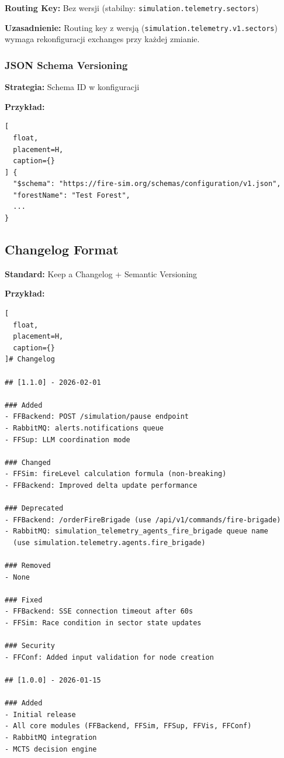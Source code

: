 \textbf{Routing Key:} Bez wersji (stabilny: \texttt{simulation.telemetry.sectors})

\textbf{Uzasadnienie:} Routing key z wersją (\texttt{simulation.telemetry.v1.sectors}) wymaga rekonfiguracji exchanges przy każdej zmianie.

\subsubsection{JSON Schema Versioning}

\textbf{Strategia:} Schema ID w konfiguracji

\textbf{Przykład:}
\begin{lstlisting}[
  float,
  placement=H,
  caption={}
] {
  "$schema": "https://fire-sim.org/schemas/configuration/v1.json",
  "forestName": "Test Forest",
  ...
}
\end{lstlisting}

\subsection{Changelog Format}

\textbf{Standard:} Keep a Changelog + Semantic Versioning

\textbf{Przykład:}
\begin{lstlisting}[
  float,
  placement=H,
  caption={}
]# Changelog

## [1.1.0] - 2026-02-01

### Added
- FFBackend: POST /simulation/pause endpoint
- RabbitMQ: alerts.notifications queue
- FFSup: LLM coordination mode

### Changed
- FFSim: fireLevel calculation formula (non-breaking)
- FFBackend: Improved delta update performance

### Deprecated
- FFBackend: /orderFireBrigade (use /api/v1/commands/fire-brigade)
- RabbitMQ: simulation_telemetry_agents_fire_brigade queue name
  (use simulation.telemetry.agents.fire_brigade)

### Removed
- None

### Fixed
- FFBackend: SSE connection timeout after 60s
- FFSim: Race condition in sector state updates

### Security
- FFConf: Added input validation for node creation

## [1.0.0] - 2026-01-15

### Added
- Initial release
- All core modules (FFBackend, FFSim, FFSup, FFVis, FFConf)
- RabbitMQ integration
- MCTS decision engine
\end{lstlisting}

